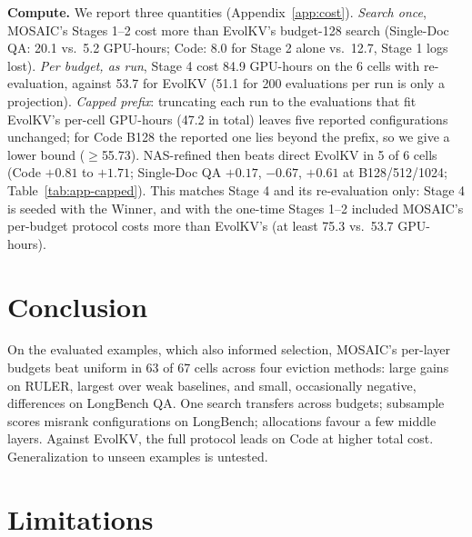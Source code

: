 \documentclass[11pt]{article}
\begin{document}
\textbf{Compute.} We report three quantities (Appendix~\ref{app:cost}). \emph{Search once}, MOSAIC's Stages 1--2 cost more than EvolKV's budget-128 search (Single-Doc QA: 20.1 vs.\ 5.2 GPU-hours; Code: 8.0 for Stage 2 alone vs.\ 12.7, Stage 1 logs lost). \emph{Per budget, as run}, Stage 4 cost 84.9 GPU-hours on the 6 cells with re-evaluation, against 53.7 for EvolKV (51.1 for 200 evaluations per run is only a projection). \emph{Capped prefix}: truncating each run to the evaluations that fit EvolKV's per-cell GPU-hours (47.2 in total) leaves five reported configurations unchanged; for Code B128 the reported one lies beyond the prefix, so we give a lower bound ($\geq$55.73). NAS-refined then beats direct EvolKV in 5 of 6 cells (Code $+0.81$ to $+1.71$; Single-Doc QA $+0.17$, $-0.67$, $+0.61$ at B128/512/1024; Table~\ref{tab:app-capped}). This matches Stage 4 and its re-evaluation only: Stage 4 is seeded with the Winner, and with the one-time Stages 1--2 included MOSAIC's per-budget protocol costs more than EvolKV's (at least 75.3 vs.\ 53.7 GPU-hours).

\section{Conclusion}

On the evaluated examples, which also informed selection, MOSAIC's per-layer budgets beat uniform in 63 of 67 cells across four eviction methods: large gains on RULER, largest over weak baselines, and small, occasionally negative, differences on LongBench QA. One search transfers across budgets; subsample scores misrank configurations on LongBench; allocations favour a few middle layers. Against EvolKV, the full protocol leads on Code at higher total cost. Generalization to unseen examples is untested.

\section*{Limitations}
\end{document}
